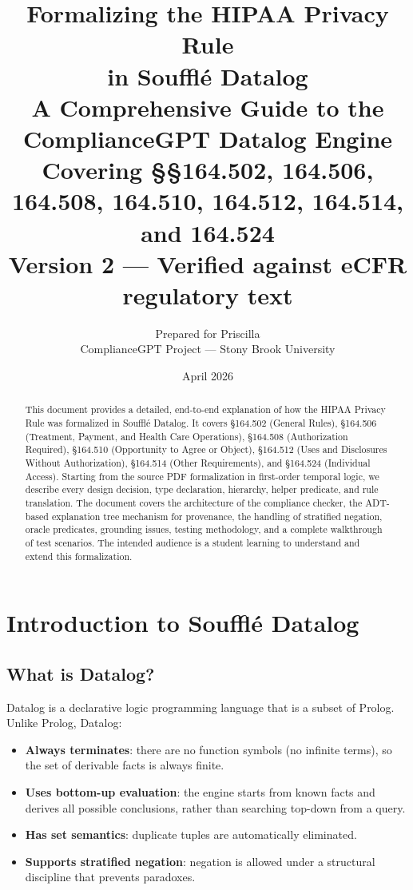 \documentclass[11pt,letterpaper]{article}
\title{%
  \textbf{Formalizing the HIPAA Privacy Rule}\\
  \textbf{in Souffl\'{e} Datalog}\\[0.5em]
  \large A Comprehensive Guide to the ComplianceGPT Datalog Engine\\
  \large Covering \S\S 164.502, 164.506, 164.508, 164.510, 164.512, 164.514, and 164.524\\[0.3em]
  \normalsize Version 2 --- Verified against eCFR regulatory text
}
\author{%
  Prepared for Priscilla\\
  ComplianceGPT Project --- Stony Brook University
}
\date{April 2026}
\begin{document}
\maketitle

\begin{abstract}
This document provides a detailed, end-to-end explanation of how the HIPAA Privacy Rule was formalized in Souffl\'{e} Datalog. It covers \S 164.502 (General Rules), \S 164.506 (Treatment, Payment, and Health Care Operations), \S 164.508 (Authorization Required), \S 164.510 (Opportunity to Agree or Object), \S 164.512 (Uses and Disclosures Without Authorization), \S 164.514 (Other Requirements), and \S 164.524 (Individual Access). Starting from the source PDF formalization in first-order temporal logic, we describe every design decision, type declaration, hierarchy, helper predicate, and rule translation. The document covers the architecture of the compliance checker, the ADT-based explanation tree mechanism for provenance, the handling of stratified negation, oracle predicates, grounding issues, testing methodology, and a complete walkthrough of test scenarios. The intended audience is a student learning to understand and extend this formalization.
\end{abstract}

\tableofcontents
\newpage

\section{Introduction to Souffl\'{e} Datalog}
\label{sec:intro-souffle}

\subsection{What is Datalog?}

Datalog is a declarative logic programming language that is a subset of Prolog. Unlike Prolog, Datalog:
\begin{itemize}
  \item \textbf{Always terminates}: there are no function symbols (no infinite terms), so the set of derivable facts is always finite.
  \item \textbf{Uses bottom-up evaluation}: the engine starts from known facts and derives all possible conclusions, rather than searching top-down from a query.
  \item \textbf{Has set semantics}: duplicate tuples are automatically eliminated.
  \item \textbf{Supports stratified negation}: negation is allowed under a structural discipline that prevents paradoxes.
\end{itemize}
\end{document}
